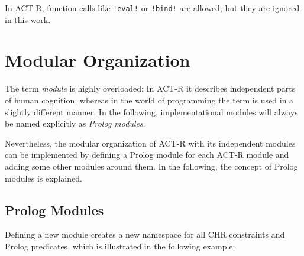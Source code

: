 In ACT-R, function calls like \verb|!eval!| or \verb|!bind!| are allowed, but they are ignored in this work.

\section{Modular Organization}

The term \emph{module} is highly overloaded: In ACT-R it describes independent parts of human cognition, whereas in the world of programming the term is used in a slightly different manner. In the following, implementational modules will always be named explicitly as \emph{Prolog modules}.

Nevertheless, the modular organization of ACT-R with its independent modules can be implemented by defining a Prolog module for each ACT-R module and adding some other modules around them. In the following, the concept of Prolog modules is explained.

\subsection{Prolog Modules}

Defining a new module creates a new namespace for all CHR constraints and Prolog predicates, which is illustrated in the following example:

